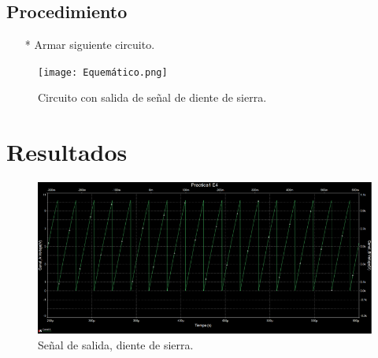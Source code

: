 \documentclass[osajnl,twocolumn,showpacs,superscriptaddress,10pt]{revtex4-1}
\begin{document}

\subsection{Procedimiento}

\begin{enumerate}
    \item[*] Armar siguiente circuito.
\end{enumerate}

\begin{figure}[H]
\centering
\texttt{[image: Equemático.png]}
\caption{Circuito con salida de señal de diente de sierra.}
\label{Esquema}
\end{figure}



\section{Resultados}

   
    
\begin{figure}[H]
\centering
\includegraphics[width = \columnwidth]{graf_1.png}
\caption{Señal de salida, diente de sierra.}
\label{Gráfica}
\end{figure}
\end{document}
